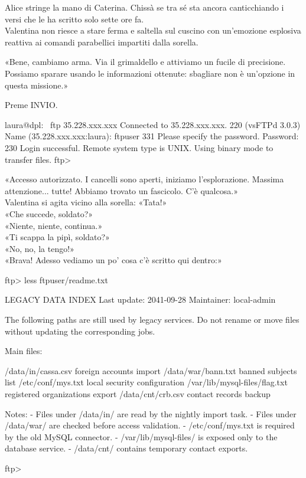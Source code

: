 \documentclass[10pt,oneside]{extbook}
\begin{document}
Alice stringe la mano di Caterina. Chissà se tra sé sta ancora canticchiando i versi  che le ha scritto solo sette ore fa.\\
Valentina non riesce a stare ferma e saltella sul cuscino con un'emozione esplosiva reattiva ai comandi parabellici impartiti dalla sorella.


\par\medskip
«Bene, cambiamo arma. Via il grimaldello e attiviamo un fucile di precisione. Possiamo sparare usando le informazioni ottenute: sbagliare non \`e un'opzione in questa missione.»

\par\medskip
Preme INVIO.
\par\medskip
\begin{terminalbox}
laura@dpl:~ ftp 35.228.xxx.xxx
Connected to 35.228.xxx.xxx.
220 (vsFTPd 3.0.3)
Name (35.228.xxx.xxx:laura): ftpuser
331 Please specify the password.
Password:
230 Login successful.
Remote system type is UNIX.
Using binary mode to transfer files.
ftp>
\end{terminalbox}

\par\medskip
«Accesso autorizzato. I cancelli sono aperti, iniziamo l'esplorazione. Massima attenzione... tutte! Abbiamo trovato un fascicolo. C'\`e qualcosa.»\\
Valentina si agita vicino alla sorella: «Tata!»\\
«Che succede, soldato?»\\
«Niente, niente, continua.»\\
«Ti scappa la pipì, soldato?»\\
«No, no, la tengo!»\\
«Brava! Adesso vediamo un po’ cosa c’\`e scritto qui dentro:»

\begin{terminalbox}
ftp> less ftpuser/readme.txt

LEGACY DATA INDEX
Last update: 2041-09-28
Maintainer: local-admin

The following paths are still used by legacy services.
Do not rename or move files without updating the corresponding jobs.

Main files:

  /data/in/cassa.csv              foreign accounts import
  /data/war/bann.txt              banned subjects list
  /etc/conf/mys.txt               local security configuration
  /var/lib/mysql-files/flag.txt   registered organizations export
  /data/cnt/crb.csv               contact records backup

Notes:
- Files under /data/in/ are read by the nightly import task.
- Files under /data/war/ are checked before access validation.
- /etc/conf/mys.txt is required by the old MySQL connector.
- /var/lib/mysql-files/ is exposed only to the database service.
- /data/cnt/ contains temporary contact exports.

ftp>
\end{terminalbox}
\end{document}
